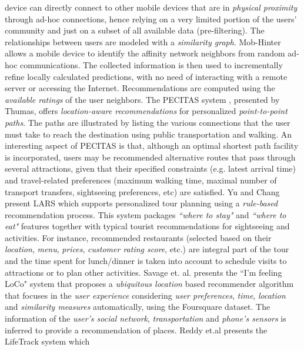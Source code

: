 device can directly connect to other mobile devices that are in 
\textit{physical proximity} through ad-hoc connections, hence 
relying on a very limited portion of the users' community and just 
on a subset of all available data (pre-filtering). The relationships 
between users are modeled with a \textit{similarity graph}. Mob-Hinter 
allows a mobile device to identify the affinity network neighbors 
from random ad-hoc communications. The collected information 
is then used to incrementally refine locally
calculated predictions, with no need of interacting with a remote
server or accessing the Internet. Recommendations are computed
using the \textit{available ratings} of the user neighbors.
The PECITAS system \cite{tumas2009personalized}, presented by Thumas, 
offers \textit{location-aware recommendations} for personalized 
\textit{point-to-point paths}. The paths are illustrated by listing 
the various connections that the user must take to reach the 
destination using public transportation and walking. An
interesting aspect of PECITAS is that, although an optimal shortest 
path facility is incorporated, users may be recommended alternative 
routes that pass through several attractions, given that
their specified constraints (e.g. latest arrival time) and travel-related 
preferences (maximum walking time, maximal number of transport
transfers, sightseeing preferences, etc) are satisfied. 
Yu and Chang present LARS  \cite{yu2009personalized} 
which supports personalized tour planning using a \textit{rule-based} 
recommendation process. This system
packages \textit{``where to stay"} and \textit{``where to eat"} 
features together with typical tourist recommendations 
for sightseeing and activities. For
instance, recommended restaurants (selected based on their 
\textit{location}, \textit{menu},  \textit{prices}, \textit{customer rating score}, 
etc.) are integral part of the tour and the time spent for 
lunch/dinner is taken into account to schedule visits to 
attractions or to plan other activities.
Savage et. al. presents the ``I'm feeling LoCo" system \cite{savage2012m}
that proposes a \textit{ubiquitous location} based recommender algorithm
that focuses in the \textit{user experience} considering 
\textit{user preferences}, \textit{time}, \textit{location} and 
\textit{similarity measures} automatically, using the Foursquare
dataset. The information of the \textit{user's social network},
\textit{transportation} and \textit{phone's sensors} is inferred to provide
a recommendation of places.
Reddy et.al \cite{reddy2006lifetrak} presents the LifeTrack system which 
